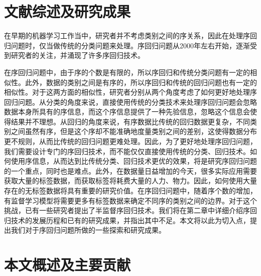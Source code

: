
\section{文献综述及研究成果}
在早期的机器学习工作当中，研究者并不考虑类别之间的序关系，因此在处理序回归问题时，仅当做传统的分类问题来处理。序回归问题从2000年左右开始，逐渐受到研究者的关注，并涌现了许多序回归技术。

在序回归问题中，由于序的个数是有限的，所以序回归和传统分类问题有一定的相似性。此外，数据的类别之间是有序的，所以序回归和传统的回归问题也有一定的相似性。对于这两方面的相似性，研究者分别从两个角度考虑了如何更好地处理序回归问题。从分类的角度来说，直接使用传统的分类技术来处理序回归问题会忽略数据本身所具有的序信息，而这个序信息提供了一种先验信息，忽略这个信息会使得结果并不理想。从回归的角度来说，有序数据比传统的回归数据更复杂，不同类别之间虽然有序，但是这个序却不能准确地度量类别之间的差别，这使得数据分布更不规则，从而比传统的回归问题更难处理。因此，为了更好地处理序回归问题，我们需要设计专门的序回归技术，而不能仅仅直接使用传统的分类、回归技术。如何使用序信息，从而达到比传统分类、回归技术更优的效果，将是研究序回归问题的一个重点，同时也是难点。此外，在数据量日益增加的今天，很多实际应用需要获取大量的标签数据，而获取标签将耗费大量的人力、物力。因此，如何使用大量存在的无标签数据将具有重要的研究价值。在序回归问题中，随着序个数的增加，有监督学习模型将需要更多有标签数据来确定不同序的类别之间的边界。对于这个挑战，已有一些研究者提出了半监督序回归技术。我们将在第二章中详细介绍序回归技术的发展历程和已有的研究成果，并指出其中不足。本文将以此为切入点，提出我们对于序回归问题所做的一些探索和研究成果。


\section{本文概述及主要贡献}
